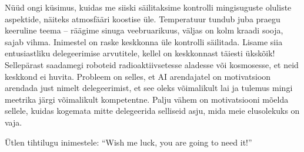 Nüüd ongi küsimus, kuidas me siiski 
säilitaksime kontrolli mingisuguste oluliste aspektide, näiteks atmosfääri 
koostise üle. Temperatuur tundub juba praegu keeruline teema -- 
räägime sinuga veebruarikuus, väljas on kolm kraadi sooja, sajab vihma. 
Inimestel on raske keskkonna üle kontrolli säilitada. Lisame siia entusiastliku 
delegeerimise arvutitele, kellel on keskkonnast täiesti ükskõik! Sellepärast 
saadamegi roboteid radioaktiivsetesse aladesse või kosmosesse, et neid keskkond 
ei huvita. Probleem on selles, et AI arendajatel on motivatsioon arendada just 
nimelt delegeerimist, et see oleks võimalikult lai ja tulemus 
mingi meetrika järgi võimalikult kompetentne. Palju vähem on 
motivatsiooni mõelda sellele, kuidas kogemata mitte 
delegeerida selliseid asju, mida meie elusolekuks on vaja.


Ütlen tihtilugu inimestele: \enquote{Wish me luck, you are going to need 
it!}